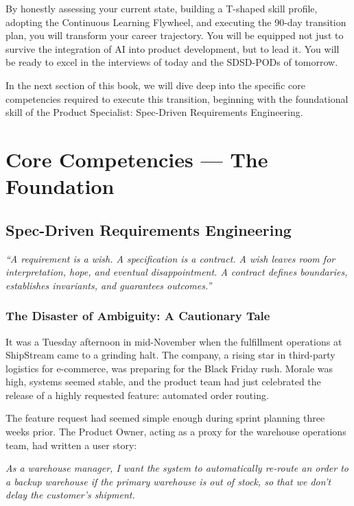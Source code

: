 \documentclass[
  11pt,
  openany,
  oneside]{book}
\renewenvironment{quote}{\begin{customquote}}{\end{customquote}}
\begin{document}
By honestly assessing your current state, building a T-shaped skill
profile, adopting the Continuous Learning Flywheel, and executing the
90-day transition plan, you will transform your career trajectory. You
will be equipped not just to survive the integration of AI into product
development, but to lead it. You will be ready to excel in the
interviews of today and the SDSD-PODs of tomorrow.

In the next section of this book, we will dive deep into the specific
core competencies required to execute this transition, beginning with
the foundational skill of the Product Specialist: Spec-Driven
Requirements Engineering.

\part{Core Competencies --- The Foundation}

\chapter{Spec-Driven Requirements
Engineering}\label{spec-driven-requirements-engineering}

\begin{quote}
\emph{``A requirement is a wish. A specification is a contract. A wish
leaves room for interpretation, hope, and eventual disappointment. A
contract defines boundaries, establishes invariants, and guarantees
outcomes.''}
\end{quote}

\section{The Disaster of Ambiguity: A Cautionary
Tale}\label{the-disaster-of-ambiguity-a-cautionary-tale}

It was a Tuesday afternoon in mid-November when the fulfillment
operations at ShipStream came to a grinding halt. The company, a rising
star in third-party logistics for e-commerce, was preparing for the
Black Friday rush. Morale was high, systems seemed stable, and the
product team had just celebrated the release of a highly requested
feature: automated order routing.

The feature request had seemed simple enough during sprint planning
three weeks prior. The Product Owner, acting as a proxy for the
warehouse operations team, had written a user story:

\emph{As a warehouse manager, I want the system to automatically
re-route an order to a backup warehouse if the primary warehouse is out
of stock, so that we don't delay the customer's shipment.}
\end{document}
